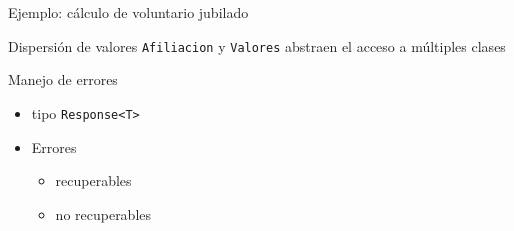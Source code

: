 \documentclass[10pt]{beamer}
\begin{document}
\begin{frame}{Ejemplo: cálculo de voluntario jubilado}
    \begin{block}{Dispersión de valores}
        \texttt{Afiliacion} y \texttt{Valores} abstraen el acceso a múltiples clases
    \end{block}
    \begin{block}{Manejo de errores}
        \begin{itemize}
            \item tipo \texttt{Response<T>}
            \item Errores
                \begin{itemize}
                    \item recuperables
                    \item no recuperables
                \end{itemize}
        \end{itemize}
    \end{block}
\end{frame}

\end{document}
